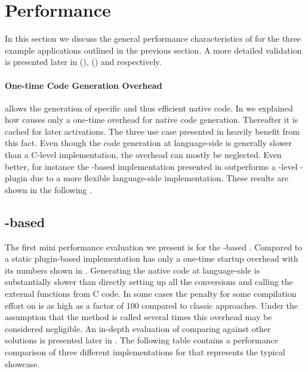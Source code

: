 \section{Performance}

In this section we discuss the general performance characteristics of \B for the three example applications outlined in the previous section.
A more detailed validation is presented later in  (\FFI),  (\WF) and  respectively.

\paragraph{One-time Code Generation Overhead} 
\B allows the generation of specific and thus efficient native code.
In  we explained how \B causes only a one-time overhead for native code generation. 
Thereafter it is cached for later activations.
The three use case presented in  heavily benefit from this fact.
Even though the code generation at language-side is generally slower than a C-level implementation, the overhead can mostly be neglected.
Even better, for instance the \B-based \FFI implementation presented in  outperforms a \VM-level \FFI-plugin due to a more flexible language-side implementation. 
These results are shown in the following .

\subsection{\B-based \FFI}

The first mini performance evaluation we present is for \NB the \B-based \FFI.
Compared to a static plugin-based \FFI implementation \NB has only a one-time startup overhead with its numbers shown in .
Generating the native code at language-side is substantially slower than directly setting up all the conversions and calling the external functions from C code. 
In some cases the penalty for some compilation effort on \NB is as high as a factor of 100 compared to classic approaches.
Under the assumption that the method is called several times this overhead may be considered negligible.
An in-depth evaluation of \NB comparing against other solutions is presented later in .
The following table contains a performance comparison of three different \FFI implementations for \PH that represents the typical showcase.

